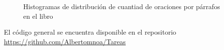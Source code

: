 \documentclass{article}
\begin{document}
\begin{figure}
\centering
{}
\label{fig:a}
\centering
{}
\label{fig:b}
\vspace{-0.2cm}
\caption{Histogramas de distribución de cuantiad de oraciones por párrafos en el libro}
\label{fig:3} 
\end{figure}

El código general se encuentra disponible en el repositorio \href{https://github.com/Albertomnoa/Tareas_MPA/tree/master/Tarea3}{https://github.com/Albertomnoa/Tareas} 

\newpage


\end{document}
